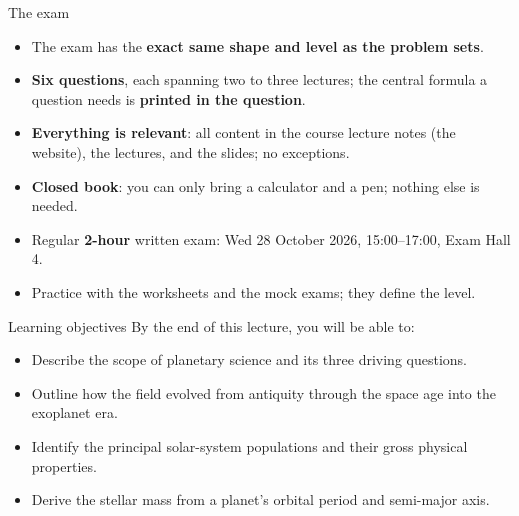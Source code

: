\documentclass[aspectratio=169, 11pt]{beamer}
\begin{document}
\begin{frame}{The exam}
  \begin{itemize}
    \item The exam has the \textbf{exact same shape and level as the problem sets}.
    \item \textbf{Six questions}, each spanning two to three lectures; the central formula a question needs is \textbf{printed in the question}.
    \item \textbf{Everything is relevant}: all content in the course lecture notes (the website), the lectures, and the slides; no exceptions.
    \item \textbf{Closed book}: you can only bring a calculator and a pen; nothing else is needed.
    \item Regular \textbf{2-hour} written exam: Wed 28 October 2026, 15:00--17:00, Exam Hall 4.
    \item Practice with the worksheets and the mock exams; they define the level.
  \end{itemize}
\end{frame}

\begin{frame}
  \titlepage
\end{frame}

\begin{frame}{Learning objectives}
  By the end of this lecture, you will be able to:
  \vskip6pt\relax
  \begin{itemize}
    \item Describe the scope of planetary science and its three driving questions.
    \item Outline how the field evolved from antiquity through the space age into the exoplanet era.
    \item Identify the principal solar-system populations and their gross physical properties.
    \item Derive the stellar mass from a planet's orbital period and semi-major axis.
  \end{itemize}
  \vskip6pt\relax
\end{frame}
\end{document}
